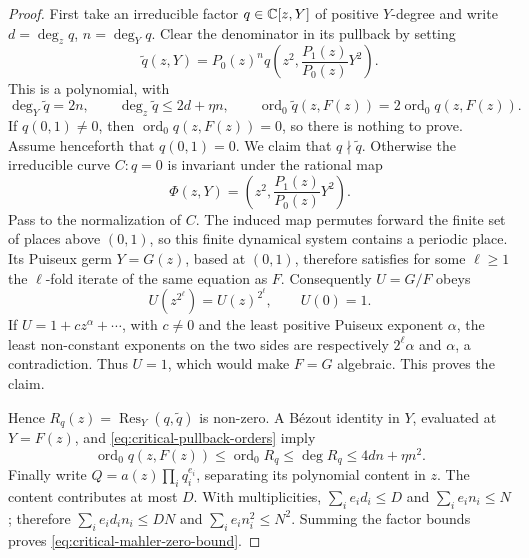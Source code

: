 \begin{proof}
First take an irreducible factor \(q\in\mathbb{C}[z,Y]\) of positive
\(Y\)-degree and write \(d=\deg_zq\), \(n=\deg_Yq\).  Clear the denominator
in its pullback by setting
\[
 \widetilde q(z,Y)=P_0(z)^n
 q\!\left(z^2,\frac{P_1(z)}{P_0(z)}Y^2\right).
\]
This is a polynomial, with
\begin{equation}\label{eq:critical-pullback-orders}
 \deg_Y\widetilde q=2n,\qquad
 \deg_z\widetilde q\le2d+\eta n,\qquad
 \operatorname{ord}_0\widetilde q(z,F(z))
 =2\operatorname{ord}_0q(z,F(z)).
\end{equation}
If \(q(0,1)\ne0\), then \(\operatorname{ord}_0q(z,F(z))=0\), so there is
nothing to prove.  Assume henceforth that \(q(0,1)=0\).
We claim that \(q\nmid\widetilde q\).  Otherwise the irreducible curve
\(C:q=0\) is invariant under the rational map
\[
 \Phi(z,Y)=\left(z^2,\frac{P_1(z)}{P_0(z)}Y^2\right).
\]
Pass to the normalization of \(C\).  The induced map permutes forward the
finite set of places above \((0,1)\), so this finite dynamical system contains
a periodic place.  Its Puiseux germ \(Y=G(z)\), based at \((0,1)\), therefore
satisfies for some \(\ell\ge1\) the \(\ell\)-fold iterate of the same equation
as \(F\).  Consequently \(U=G/F\) obeys
\[
 U(z^{2^\ell})=U(z)^{2^\ell},\qquad U(0)=1.
\]
If \(U=1+cz^\alpha+\cdots\), with \(c\ne0\) and the least positive Puiseux
exponent \(\alpha\), the least non-constant exponents on the two sides are
respectively \(2^\ell\alpha\) and \(\alpha\), a contradiction.  Thus
\(U=1\), which would make \(F=G\) algebraic.  This proves the claim.

Hence \(R_q(z)=\operatorname{Res}_Y(q,\widetilde q)\) is non-zero.  A
B\'ezout identity in \(Y\), evaluated at \(Y=F(z)\), and
\eqref{eq:critical-pullback-orders} imply
\[
 \operatorname{ord}_0q(z,F(z))
 \le\operatorname{ord}_0R_q
 \le\deg R_q
 \le4dn+\eta n^2.
\]
Finally write \(Q=a(z)\prod_iq_i^{e_i}\), separating its polynomial content
in \(z\).  The content contributes at most \(D\).  With multiplicities,
\(\sum_i e_id_i\le D\) and \(\sum_i e_in_i\le N\); therefore
\(\sum_i e_id_in_i\le DN\) and
\(\sum_i e_in_i^2\le N^2\).  Summing the factor bounds proves
\eqref{eq:critical-mahler-zero-bound}.
\end{proof}



